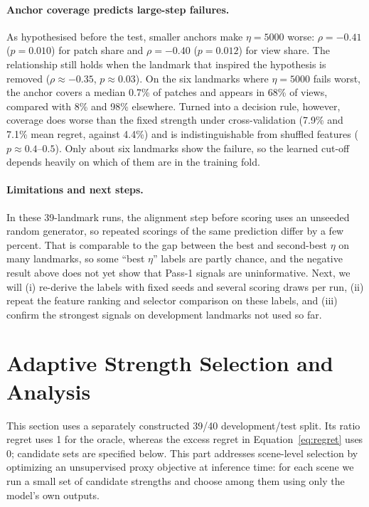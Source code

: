 \documentclass[sigconf,nonacm]{acmart}
\begin{document}
\paragraph{Anchor coverage predicts large-step failures.} As hypothesised before the test, smaller anchors make $\eta=5000$ worse: $\rho=-0.41$ ($p=0.010$) for patch share and $\rho=-0.40$ ($p=0.012$) for view share. The relationship still holds when the landmark that inspired the hypothesis is removed ($\rho\approx-0.35$, $p\approx0.03$). On the six landmarks where $\eta=5000$ fails worst, the anchor covers a median 0.7\% of patches and appears in 68\% of views, compared with 8\% and 98\% elsewhere. Turned into a decision rule, however, coverage does worse than the fixed strength under cross-validation (7.9\% and 7.1\% mean regret, against 4.4\%) and is indistinguishable from shuffled features ($p\approx0.4$--$0.5$). Only about six landmarks show the failure, so the learned cut-off depends heavily on which of them are in the training fold.

\paragraph{Limitations and next steps.} In these 39-landmark runs, the alignment step before scoring uses an unseeded random generator, so repeated scorings of the same prediction differ by a few percent. That is comparable to the gap between the best and second-best $\eta$ on many landmarks, so some ``best $\eta$'' labels are partly chance, and the negative result above does not yet show that Pass-1 signals are uninformative. Next, we will (i) re-derive the labels with fixed seeds and several scoring draws per run, (ii) repeat the feature ranking and selector comparison on these labels, and (iii) confirm the strongest signals on development landmarks not used so far.

\section{Adaptive Strength Selection and Analysis}
\label{sec:swati}
This section uses a separately constructed 39/40 development/test split. Its ratio regret uses 1 for the oracle, whereas the excess regret in Equation~\ref{eq:regret} uses 0; candidate sets are specified below. This part addresses scene-level selection by optimizing an unsupervised proxy objective at inference time: for each scene we run a small set of candidate strengths and choose among them using only the model's own outputs.
\end{document}
